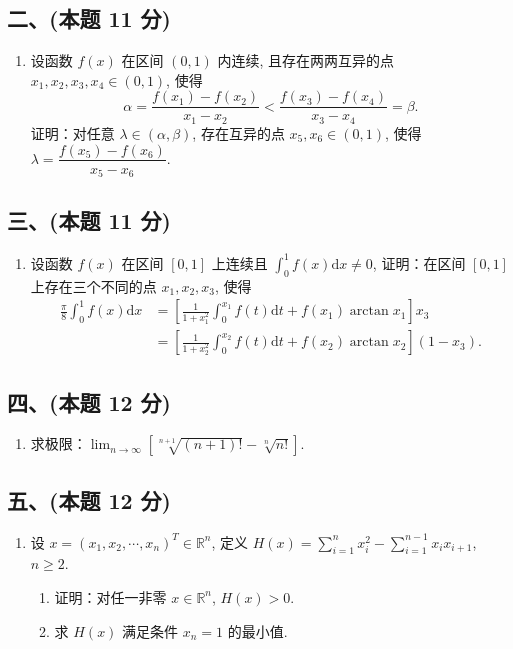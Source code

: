 \subsection*{二、(本题 11 分)}
\begin{enumerate}[start=6]
    \item 设函数 $f(x)$ 在区间 $(0, 1)$ 内连续, 且存在两两互异的点 $x_1, x_2, x_3, x_4 \in (0, 1)$, 使得
          \[
              \alpha = \frac{f(x_1) - f(x_2)}{x_1 - x_2} < \frac{f(x_3) - f(x_4)}{x_3 - x_4} = \beta.
          \]
          证明：对任意 $\lambda \in (\alpha, \beta)$, 存在互异的点 $x_5, x_6 \in (0, 1)$, 使得 $\lambda = \dfrac{f(x_5) - f(x_6)}{x_5 - x_6}$.
\end{enumerate}

\subsection*{三、(本题 11 分)}
\begin{enumerate}[start=7]
    \item 设函数 $f(x)$ 在区间 $[0, 1]$ 上连续且 $\displaystyle\int_{0}^{1} f(x) \mathrm{d}x \neq 0$, 证明：在区间 $[0, 1]$ 上存在三个不同的点 $x_1, x_2, x_3$, 使得
          \begin{align*}
              \frac{\pi}{8} \int_{0}^{1} f(x) \mathrm{d}x & = \left[ \frac{1}{1 + x_1^2} \int_{0}^{x_1} f(t) \mathrm{d}t + f(x_1) \arctan x_1 \right] x_3        \\
                                                          & = \left[ \frac{1}{1 + x_2^2} \int_{0}^{x_2} f(t) \mathrm{d}t + f(x_2) \arctan x_2 \right] (1 - x_3).
          \end{align*}
\end{enumerate}

\subsection*{四、(本题 12 分)}
\begin{enumerate}[start=8]
    \item 求极限：$\displaystyle\lim_{n \to \infty} \left[ \sqrt[n+1]{(n+1)!} - \sqrt[n]{n!} \right]$.
\end{enumerate}

\subsection*{五、(本题 12 分)}
\begin{enumerate}[start=9]
    \item 设 $x = (x_1, x_2, \cdots, x_n)^T \in \mathbb{R}^n$, 定义 $H(x) = \displaystyle\sum_{i=1}^{n} x_i^2 - \displaystyle\sum_{i=1}^{n-1} x_i x_{i+1}$, $n \geqslant 2$.
          \begin{enumerate}
              \item[(1)] 证明：对任一非零 $x \in \mathbb{R}^n$, $H(x) > 0$.
              \item[(2)] 求 $H(x)$ 满足条件 $x_n = 1$ 的最小值.
          \end{enumerate}
\end{enumerate}

